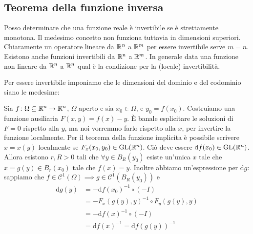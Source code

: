 \documentclass[a4paper]{article}
\begin{document}
\begin{center}
\end{center}

\subsection{Teorema della funzione inversa}

Posso determinare che una funzione reale è invertibile se è strettamente monotona.
Il medesimo concetto non funziona tuttavia in dimensioni superiori.
Chiaramente un operatore lineare da \(\mathbb{R}^n\) a \(\mathbb{R}^m\)
per essere invertibile serve \(m=n\).
Esistono anche funzioni invertibili da \(\mathbb{R}^n\) a \(\mathbb{R}^m\).
In generale data una funzione non lineare da \(\mathbb{R}^n\) a \(\mathbb{R}^n\)
qual è la condizione per la (locale) invertibilità.

Per essere invertibile imponiamo che le dimensioni del dominio e del codominio siano le medesime:

Sia \(f \colon \Omega \subseteq \mathbb{R}^n \to \mathbb{R}^n\),
\(\Omega\) aperto e sia \(x_0 \in \Omega\), e \(y_0 = f(x_0)\).
Costruiamo una funzione ausiliaria
\(F(x,y) = f(x) -y\).
È banale esplicitare le soluzioni di \(F=0\) rispetto alla \(y\), ma noi
vorremmo farlo rispetto alla \(x\), per invertire la funzione localmente.
Per il teorema della funzione implicita è possibile scrivere \(x=x(y)\) localmente
se \(F_x(x_0, y_0) \in \text{GL}(\mathbb{R}^n)\).
Ciò deve essere \(\text{d}f(x_0) \in \text{GL}(\mathbb{R}^n)\).
Allora esistono \(r,R > 0\) tali che \(\forall y \in B_R(y_0)\)
esiste un'unica \(x\) tale che \(x=g(y) \in B_r(x_0)\)
tale che \(f(x)=y\).
Inoltre abbiamo un'espressione per \(\text{d}g\):
sappiamo che \(f \in \mathcal{C}^1(\Omega) \implies g \in \mathcal{C}^1(B_R(y_0))\)
e \begin{align*}
    \text{d}g(y) &= -\text{d}f(x_0)^{-1} \circ (-I) \\
    &= -F_x(g(y), y)^{-1} \circ F_y(g(y), y) \\
    &= -\text{d}f(x)^{-1} \circ (-I) \\
    &= \text{d}f(x)^{-1} = \text{d}f(g(y))^{-1}
\end{align*}
\end{document}
